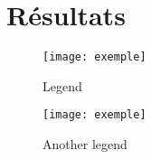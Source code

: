 \section{Résultats}

\begin{minipage}{0.49\linewidth}
	\begin{figure}[H] 
		\begin{center}
		\texttt{[image: exemple]}
 		\caption{Legend}
		\label{st2-f}
		\end{center}
	\end{figure}
\end{minipage}
\hspace{1ex}
\begin{minipage}{0.49\linewidth}
	\begin{figure}[H] \begin{center}
		\texttt{[image: exemple]}
		\caption{ Another legend}
		\label{ST3-1}
		\end{center}
\end{figure}
 \end{minipage}
